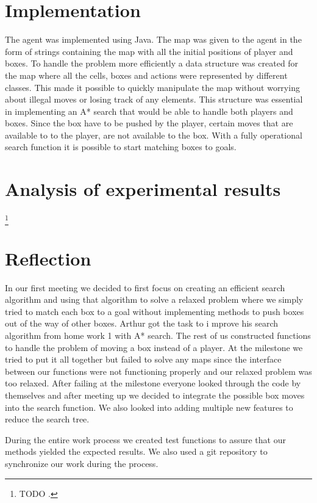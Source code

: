 \documentclass{article}
\begin{document}
\section {Implementation}
The agent was implemented using Java. The map was given to the agent in the form of strings containing the map with all the initial positions of player and boxes. To handle the problem more efficiently a data structure was created for the map where all the cells, boxes and actions were represented by different classes. This made it possible to quickly manipulate the map without worrying about illegal moves or losing track of any elements. 
This structure was essential in implementing an A* search  that would be able to handle both players and boxes. Since the box have to be pushed by the player, certain moves that are available to to the player, are not available to the box. 
With a fully operational search function it is possible to start matching boxes to goals. 

\section {Analysis of experimental results}
\lipsum[1]\footnote { TODO .}

\section {Reflection}
In our first meeting we decided to first focus on creating an efficient search algorithm and using that algorithm to solve a relaxed problem where we simply tried to match each box to a goal without implementing methods to push boxes out of the way of other boxes. Arthur got the task to i mprove his search algorithm from home work 1 with A* search. The rest of us constructed functions to handle the problem of moving a box instead of a player. At the milestone we tried to put it all together but failed to solve any maps since the interface between our functions were not functioning properly and our relaxed problem was too relaxed. 
After failing at the milestone everyone looked through the code by themselves and after meeting up we decided to integrate the possible box moves into the search function. 	We also looked into adding multiple new features to reduce the search tree. 

During the entire work process we created test functions to assure that our methods yielded the expected results. We also used a git repository to synchronize our work during the process. 
\end{document}
